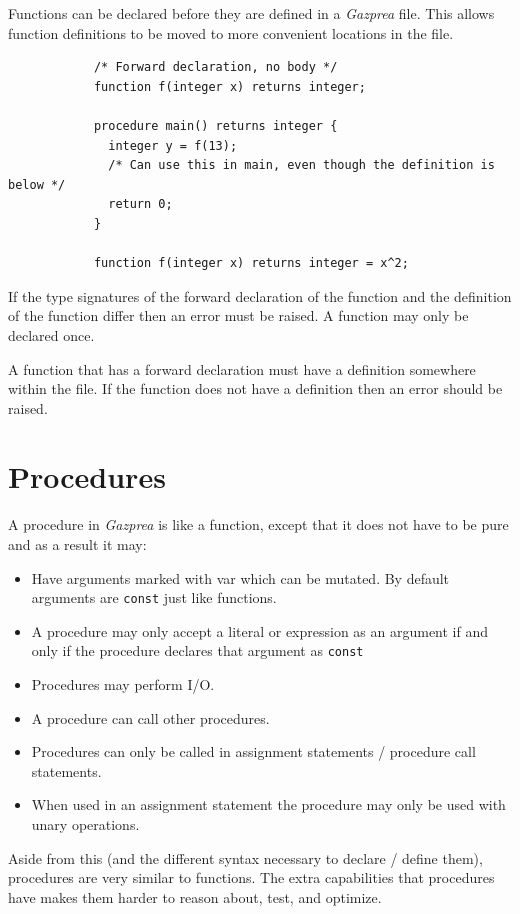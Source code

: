\documentclass{article}
\begin{document}
		Functions can be declared before they are defined in a \textit{Gazprea} file.  This allows function definitions
		to be moved to more convenient locations in the file.

		\begin{lstlisting}
			/* Forward declaration, no body */
			function f(integer x) returns integer;

			procedure main() returns integer {
			  integer y = f(13);
			  /* Can use this in main, even though the definition is below */
			  return 0;
			}

			function f(integer x) returns integer = x^2;
		\end{lstlisting}


		If the type signatures of the forward declaration of the function and the definition of the function differ then
		an error must be raised. A function may only be declared once.

		A function that has a forward declaration must have a definition somewhere within the file. If the function does
		not have a definition then an error should be raised.


\section{Procedures}\label{sec:procedure}

	A procedure in \textit{Gazprea} is like a function, except that it does not have to be pure and as a result it may:

	\begin{itemize}
		\item Have arguments marked with var which can be mutated. By default arguments are \texttt{const} just like
		functions.
		\item A procedure may only accept a literal or expression as an argument if and only if the procedure declares
		that argument as \texttt{const}
		\item Procedures may perform I/O.
		\item A procedure can call other procedures.
		\item Procedures can only be called in assignment statements / procedure call statements.
		\item When used in an assignment statement the procedure may only be used with unary operations.
	\end{itemize}

	Aside from this (and the different syntax necessary to declare / define them), procedures are very similar to
	functions. The extra capabilities that procedures have makes them harder to reason about, test, and optimize.
\end{document}
